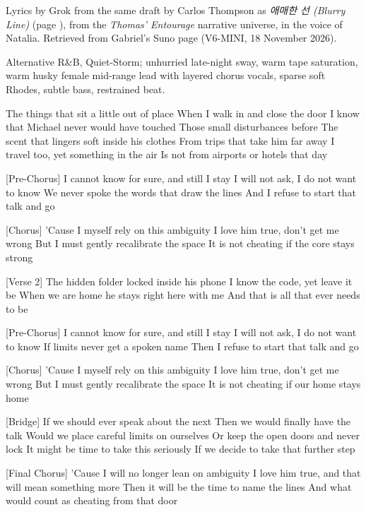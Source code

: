 \label{sec:recalibrate-the-space}
\begin{notes}
Lyrics by Grok from the same draft by Carlos Thompson as \emph{애매한 선 (Blurry Line)} (page \pageref{sec:blurry-line}), from the \emph{Thomas' Entourage} narrative universe, in the voice of Natalia. Retrieved from Gabriel's Suno page (V6-MINI, 18 November 2026).
\end{notes}
\begin{style}
Alternative R\&B, Quiet-Storm; unhurried late-night sway, warm tape saturation, warm husky female mid-range lead with layered chorus vocals, sparse soft Rhodes, subtle bass, restrained beat.
\end{style}
\begin{lyrics}
[Verse 1]
The things that sit a little out of place
When I walk in and close the door
I know that Michael never would have touched
Those small disturbances before
The scent that lingers soft inside his clothes
From trips that take him far away
I travel too, yet something in the air
Is not from airports or hotels that day

[Pre-Chorus]
I cannot know for sure, and still I stay
I will not ask, I do not want to know
We never spoke the words that draw the lines
And I refuse to start that talk and go

[Chorus]
’Cause I myself rely on this ambiguity
I love him true, don’t get me wrong
But I must gently recalibrate the space
It is not cheating if the core stays strong

[Verse 2]
The hidden folder locked inside his phone
I know the code, yet leave it be
When we are home he stays right here with me
And that is all that ever needs to be

[Pre-Chorus]
I cannot know for sure, and still I stay
I will not ask, I do not want to know
If limits never get a spoken name
Then I refuse to start that talk and go

[Chorus]
’Cause I myself rely on this ambiguity
I love him true, don’t get me wrong
But I must gently recalibrate the space
It is not cheating if our home stays home

[Bridge]
If we should ever speak about the next
Then we would finally have the talk
Would we place careful limits on ourselves
Or keep the open doors and never lock
It might be time to take this seriously
If we decide to take that further step

[Final Chorus]
’Cause I will no longer lean on ambiguity
I love him true, and that will mean something more
Then it will be the time to name the lines
And what would count as cheating from that door
\end{lyrics}

